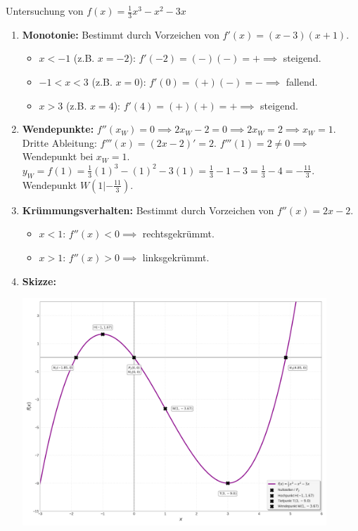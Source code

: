 \begin{beispielumgebung}{Untersuchung von $f(x) = \frac{1}{3}x^3 - x^2 - 3x$}
\begin{enumerate}
        $f''(3) = 2(3) - 2 = 6-2=4 > 0 \implies$ Tiefpunkt bei $x=3$.
        $y_T = f(3) = \frac{1}{3}(3)^3 - (3)^2 - 3(3) = 9 - 9 - 9 = -9$. Tiefpunkt $T(3|-9)$.
        $f''(-1) = 2(-1) - 2 = -2-2=-4 < 0 \implies$ Hochpunkt bei $x=-1$.
        $y_H = f(-1) = \frac{1}{3}(-1)^3 - (-1)^2 - 3(-1) = -\frac{1}{3} - 1 + 3 = -\frac{1}{3} + 2 = \frac{5}{3}$. Hochpunkt $H(-1|\frac{5}{3})$.
    \item \textbf{Monotonie:} Bestimmt durch Vorzeichen von $f'(x)=(x-3)(x+1)$.
        \begin{itemize}
            \item $x < -1$ (z.B. $x=-2$): $f'(-2)=(-)(-)=+ \implies$ steigend.
            \item $-1 < x < 3$ (z.B. $x=0$): $f'(0)=(+)(-)=- \implies$ fallend.
            \item $x > 3$ (z.B. $x=4$): $f'(4)=(+)(+)=+ \implies$ steigend.
        \end{itemize}
    \item \textbf{Wendepunkte:} $f''(x_W)=0 \implies 2x_W - 2 = 0 \implies 2x_W=2 \implies x_W=1$.
        Dritte Ableitung: $f'''(x) = (2x-2)' = 2$.
        $f'''(1) = 2 \neq 0 \implies$ Wendepunkt bei $x_W=1$.
        $y_W = f(1) = \frac{1}{3}(1)^3 - (1)^2 - 3(1) = \frac{1}{3} - 1 - 3 = \frac{1}{3} - 4 = -\frac{11}{3}$.
        Wendepunkt $W(1|-\frac{11}{3})$.
    \item \textbf{Krümmungsverhalten:} Bestimmt durch Vorzeichen von $f''(x)=2x-2$.
        \begin{itemize}
            \item $x < 1$: $f''(x) < 0 \implies$ rechtsgekrümmt.
            \item $x > 1$: $f''(x) > 0 \implies$ linksgekrümmt.
        \end{itemize}
    \item \textbf{Skizze:}
\begin{center}
    \includegraphics[width=0.9\textwidth]{grafiken/Kurvendiskussion_Polynom3.png}
    \label{fig:kurvendisk_poly3}
\end{center}
\end{enumerate}
\end{beispielumgebung}

